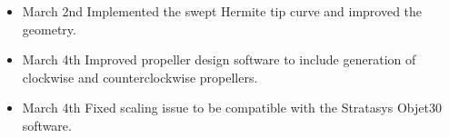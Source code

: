 \documentclass{article}
\begin{document}
\begin{itemize}
    \item March 2nd Implemented the swept Hermite tip curve and improved the geometry.
    \item March 4th Improved propeller design software to include generation of clockwise and counterclockwise propellers.
    \item March 4th Fixed scaling issue to be compatible with the Stratasys Objet30 software.

\end{itemize}
\end{document}
